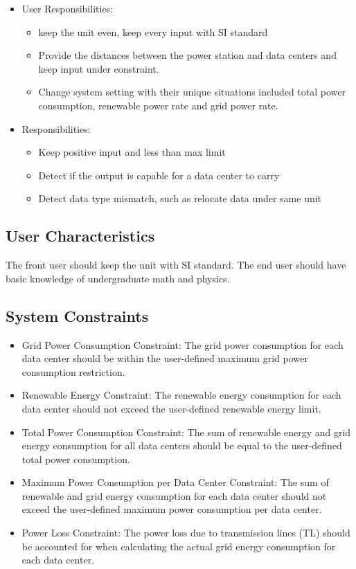 \documentclass[12pt]{article}
\begin{document}
\begin{itemize}
\item User Responsibilities:
\begin{itemize}
\item keep the unit even, keep every input with SI standard
\item Provide the distances between the power station and data centers and keep input under constraint.
\item Change system setting with their unique situations included total power consumption, renewable power rate and grid power rate.

\end{itemize}
\item {} Responsibilities:
\begin{itemize}
\item Keep positive input and less than max limit
\item Detect if the output is capable for a data center to carry
\item Detect data type mismatch, such as relocate data under same unit
\end{itemize}
\end{itemize}

\subsection{User Characteristics} \label{SecUserCharacteristics}

{The front user should keep the unit with SI standard. The end user should have basic knowledge of undergraduate math and physics.}

\subsection{System Constraints}

\begin{itemize}
\item Grid Power Consumption Constraint: The grid power consumption for each data center should be within the user-defined maximum grid power consumption restriction.
\item Renewable Energy Constraint: The renewable energy consumption for each data center should not exceed the user-defined renewable energy limit.
\item Total Power Consumption Constraint: The sum of renewable energy and grid energy consumption for all data centers should be equal to the user-defined total power consumption.
\item Maximum Power Consumption per Data Center Constraint: The sum of renewable and grid energy consumption for each data center should not exceed the user-defined maximum power consumption per data center.
\item Power Loss Constraint: The power loss due to transmission lines (TL) should be accounted for when calculating the actual grid energy consumption for each data center.
\end{itemize}
\end{document}
